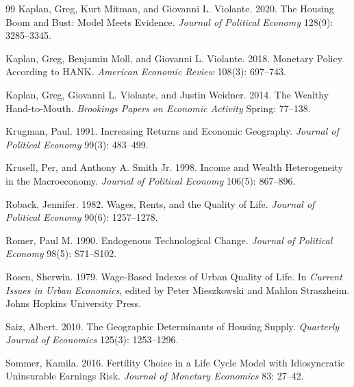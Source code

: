 \documentclass[11pt]{article}
\begin{document}
\begin{thebibliography}{99}
Kaplan, Greg, Kurt Mitman, and Giovanni L. Violante. 2020.
The Housing Boom and Bust: Model Meets Evidence.
\emph{Journal of Political Economy} 128(9): 3285--3345.

Kaplan, Greg, Benjamin Moll, and Giovanni L. Violante. 2018.
Monetary Policy According to HANK.
\emph{American Economic Review} 108(3): 697--743.

Kaplan, Greg, Giovanni L. Violante, and Justin Weidner. 2014.
The Wealthy Hand-to-Mouth.
\emph{Brookings Papers on Economic Activity} Spring: 77--138.

Krugman, Paul. 1991.
Increasing Returns and Economic Geography.
\emph{Journal of Political Economy} 99(3): 483--499.

Krusell, Per, and Anthony A. Smith Jr. 1998.
Income and Wealth Heterogeneity in the Macroeconomy.
\emph{Journal of Political Economy} 106(5): 867--896.

Roback, Jennifer. 1982.
Wages, Rents, and the Quality of Life.
\emph{Journal of Political Economy} 90(6): 1257--1278.

Romer, Paul M. 1990.
Endogenous Technological Change.
\emph{Journal of Political Economy} 98(5): S71--S102.

Rosen, Sherwin. 1979.
Wage-Based Indexes of Urban Quality of Life.
In \emph{Current Issues in Urban Economics}, edited by Peter Mieszkowski and Mahlon Straszheim. Johns Hopkins University Press.

Saiz, Albert. 2010.
The Geographic Determinants of Housing Supply.
\emph{Quarterly Journal of Economics} 125(3): 1253--1296.

Sommer, Kamila. 2016.
Fertility Choice in a Life Cycle Model with Idiosyncratic Uninsurable Earnings Risk.
\emph{Journal of Monetary Economics} 83: 27--42.

\end{thebibliography}
\end{document}
